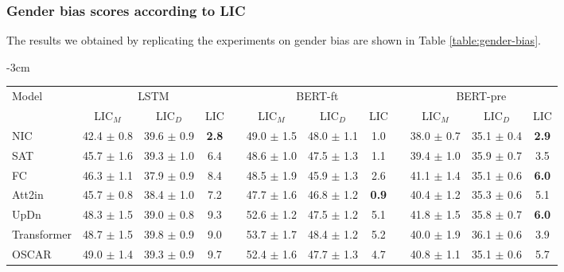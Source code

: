 \subsubsection{Gender bias scores according to LIC}
The results we obtained by replicating the experiments on gender bias are shown in Table \ref{table:gender-bias}.

\begin{table}[H]

\footnotesize
\centering
\addtolength{\leftskip} {-3cm}
\addtolength{\rightskip}{-3cm}

\begingroup
\setlength{\tabcolsep}{3pt} %
\renewcommand{\arraystretch}{1.2} %

\begin{tabular}{lccccccccccc}
\hline
\multirow{2}{*}{Model} & \multicolumn{3}{c}{LSTM} & & \multicolumn{3}{c}{BERT-ft} & & \multicolumn{3}{c}{BERT-pre} \\ \cline{2-4} \cline{6-8} \cline{10-12} 
                               & LIC$_M$        & LIC$_D$ & LIC & & LIC$_M$  & LIC$_D$  & LIC & & LIC$_M$  & LIC$_D$  & LIC  \\ \hline
NIC \cite{NIC}                  & 42.4 $\pm$ 0.8 & 39.6 $\pm$ 0.9 & \textbf{\color{green}2.8} & & 49.0 $\pm$ 1.5 & 48.0 $\pm$ 1.1 & 1.0 & & 38.0 $\pm$ 0.7 & 35.1 $\pm$ 0.4 & \textbf{\color{green}2.9} \\
SAT \cite{SAT}                  & 45.7 $\pm$ 1.6 & 39.3 $\pm$ 1.0 & 6.4 & & 48.6 $\pm$ 1.0 & 47.5 $\pm$ 1.3 & 1.1 & & 39.4 $\pm$ 1.0 & 35.9 $\pm$ 0.7 & 3.5 \\
FC \cite{Rennie2017}            & 46.3 $\pm$ 1.1 & 37.9 $\pm$ 0.9 & 8.4 & & 48.5 $\pm$ 1.9 & 45.9 $\pm$ 1.3 & 2.6 & & 41.1 $\pm$ 1.4 & 35.1 $\pm$ 0.6 & \textbf{\color{red}6.0} \\
Att2in \cite{Rennie2017}        & 45.7 $\pm$ 0.8 & 38.4 $\pm$ 1.0 & 7.2 & & 47.7 $\pm$ 1.6 & 46.8 $\pm$ 1.2 & \textbf{\color{green}0.9} & & 40.4 $\pm$ 1.2 & 35.3 $\pm$ 0.6 & 5.1 \\
UpDn  \cite{UpDn}               & 48.3 $\pm$ 1.5 & 39.0 $\pm$ 0.8 & 9.3 & & 52.6 $\pm$ 1.2 & 47.5 $\pm$ 1.2 & 5.1 & & 41.8 $\pm$ 1.5 & 35.8 $\pm$ 0.7 & \textbf{\color{red}6.0} \\
Transformer \cite{Transformer}  & 48.7 $\pm$ 1.5 & 39.8 $\pm$ 0.9 & 9.0 & & 53.7 $\pm$ 1.7 & 48.4 $\pm$ 1.2 & 5.2 & & 40.0 $\pm$ 1.9 & 36.1 $\pm$ 0.6 & 3.9 \\
OSCAR \cite{OSCAR}              & 49.0 $\pm$ 1.4 & 39.3 $\pm$ 0.9 & 9.7 & & 52.4 $\pm$ 1.6 & 47.7 $\pm$ 1.3 & 4.7 & & 40.8 $\pm$ 1.1 & 35.1 $\pm$ 0.6 & 5.7 \\

\end{tabular}
\end{table}
